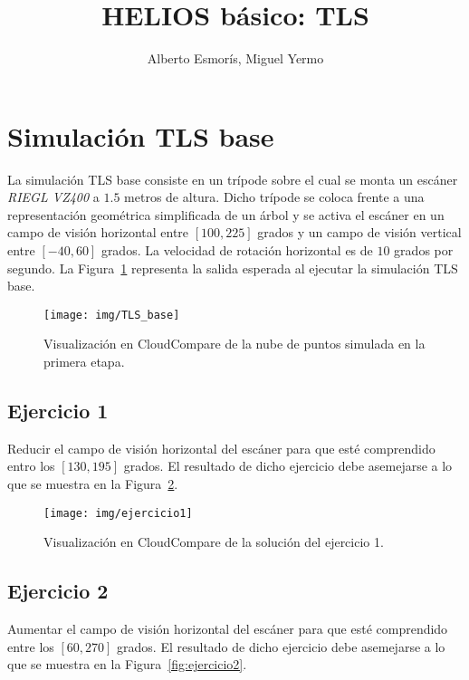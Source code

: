 \documentclass[]{article}
\title{HELIOS básico: TLS}
\author{Alberto Esmorís, Miguel Yermo}
\date{}
\begin{document}
	
	\maketitle
	
	
	
	\section*{Simulación TLS base}
	La simulación TLS base consiste en un trípode sobre el cual se monta un escáner \textit{RIEGL VZ400} a $1.5$ metros de altura. Dicho trípode se coloca frente a una representación geométrica simplificada de un árbol y se activa el escáner en un campo de visión horizontal entre $[100, 225]$ grados y un campo de visión vertical entre $[-40, 60]$ grados. La velocidad de rotación horizontal es de $10$ grados por segundo. La Figura~\ref{fig:tls_base} representa la salida esperada al ejecutar la simulación TLS base.
	
	\begin{figure}[htb]
		\centering
		\texttt{[image: img/TLS\_base]}
		\caption{Visualización en CloudCompare de la nube de puntos simulada en la primera etapa.}
		\label{fig:tls_base}
	\end{figure}


	\pagebreak
	

	\subsection*{Ejercicio 1}
	Reducir el campo de visión horizontal del escáner para que esté comprendido entro los $[130, 195]$ grados. El resultado de dicho ejercicio debe asemejarse a lo que se muestra en la Figura~\ref{fig:ejercicio1}.
	
	\begin{figure}[htb]
		\centering
		\texttt{[image: img/ejercicio1]}
		\caption{Visualización en CloudCompare de la solución del ejercicio 1.}
		\label{fig:ejercicio1}	
	\end{figure}


	\subsection*{Ejercicio 2}
	Aumentar el campo de visión horizontal del escáner para que esté comprendido entre los $[60, 270]$ grados. El resultado de dicho ejercicio debe asemejarse a lo que se muestra en la Figura~\ref{fig:ejercicio2}.
	
\end{document}
